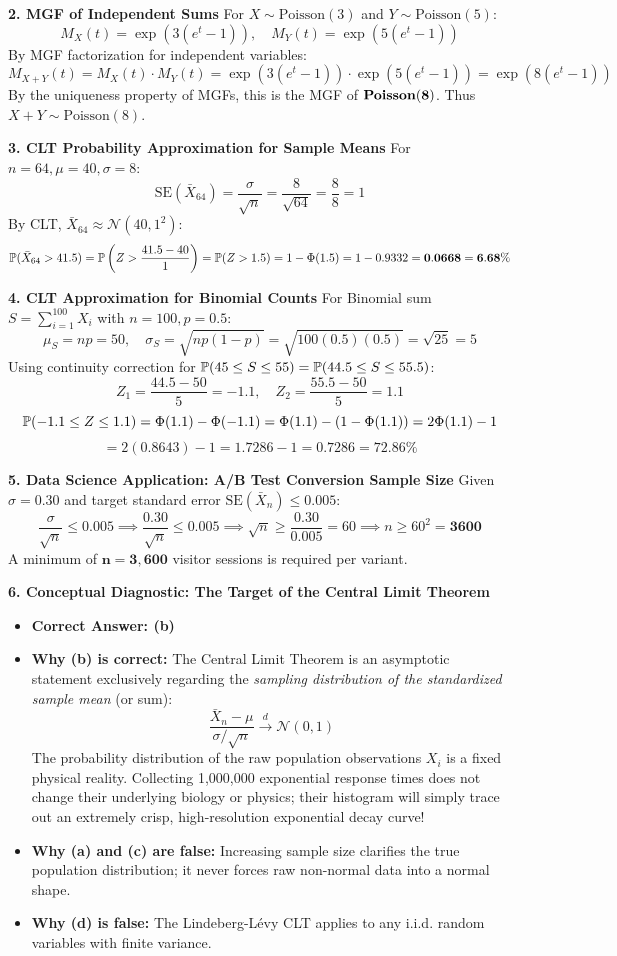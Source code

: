\textbf{2. MGF of Independent Sums}
For $X \sim \text{Poisson}(3)$ and $Y \sim \text{Poisson}(5)$:
$$M_X(t) = \exp(3(e^t - 1)), \quad M_Y(t) = \exp(5(e^t - 1))$$
By MGF factorization for independent variables:
$$M_{X+Y}(t) = M_X(t) \cdot M_Y(t) = \exp(3(e^t - 1)) \cdot \exp(5(e^t - 1)) = \exp(8(e^t - 1))$$
By the uniqueness property of MGFs, this is the MGF of $\mathbf{\text{\textbf{Poisson}}(8)}$. Thus $X + Y \sim \text{Poisson}(8)$.

\textbf{3. CLT Probability Approximation for Sample Means}
For $n = 64, \mu = 40, \sigma = 8$:
$$\text{SE}(\bar{X}_{64}) = \frac{\sigma}{\sqrt{n}} = \frac{8}{\sqrt{64}} = \frac{8}{8} = 1$$
By CLT, $\bar{X}_{64} \approx \mathcal{N}(40, 1^2)$:
$$\P(\bar{X}_{64} > 41.5) = \P\left( Z > \frac{41.5 - 40}{1} \right) = \P(Z > 1.5) = 1 - \Phi(1.5) = 1 - 0.9332 = \mathbf{0.0668 = 6.68\%}$$

\textbf{4. CLT Approximation for Binomial Counts}
For Binomial sum $S = \sum_{i=1}^{100} X_i$ with $n = 100, p = 0.5$:
$$\mu_S = np = 50, \quad \sigma_S = \sqrt{np(1-p)} = \sqrt{100(0.5)(0.5)} = \sqrt{25} = 5$$
Using continuity correction for $\P(45 \le S \le 55) = \P(44.5 \le S \le 55.5)$:
$$Z_1 = \frac{44.5 - 50}{5} = -1.1, \quad Z_2 = \frac{55.5 - 50}{5} = 1.1$$
$$\P(-1.1 \le Z \le 1.1) = \Phi(1.1) - \Phi(-1.1) = \Phi(1.1) - (1 - \Phi(1.1)) = 2\Phi(1.1) - 1$$
$$= 2(0.8643) - 1 = 1.7286 - 1 = \mathbf{0.7286 = 72.86\%}$$

\textbf{5. Data Science Application: A/B Test Conversion Sample Size}
Given $\sigma = 0.30$ and target standard error $\text{SE}(\bar{X}_n) \le 0.005$:
$$\frac{\sigma}{\sqrt{n}} \le 0.005 \implies \frac{0.30}{\sqrt{n}} \le 0.005 \implies \sqrt{n} \ge \frac{0.30}{0.005} = 60 \implies n \ge 60^2 = \mathbf{3600}$$
A minimum of $\mathbf{n = 3,600}$ visitor sessions is required per variant.

\textbf{6. Conceptual Diagnostic: The Target of the Central Limit Theorem}
\begin{itemize}
    \item \textbf{Correct Answer: (b)}
    \item \textbf{Why (b) is correct:} The Central Limit Theorem is an asymptotic statement exclusively regarding the \emph{sampling distribution of the standardized sample mean} (or sum):
    $$\frac{\bar{X}_n - \mu}{\sigma/\sqrt{n}} \xrightarrow{d} \mathcal{N}(0, 1)$$
    The probability distribution of the raw population observations $X_i$ is a fixed physical reality. Collecting 1,000,000 exponential response times does not change their underlying biology or physics; their histogram will simply trace out an extremely crisp, high-resolution exponential decay curve!
    \item \textbf{Why (a) and (c) are false:} Increasing sample size clarifies the true population distribution; it never forces raw non-normal data into a normal shape.
    \item \textbf{Why (d) is false:} The Lindeberg-Lévy CLT applies to any i.i.d. random variables with finite variance.
\end{itemize}

